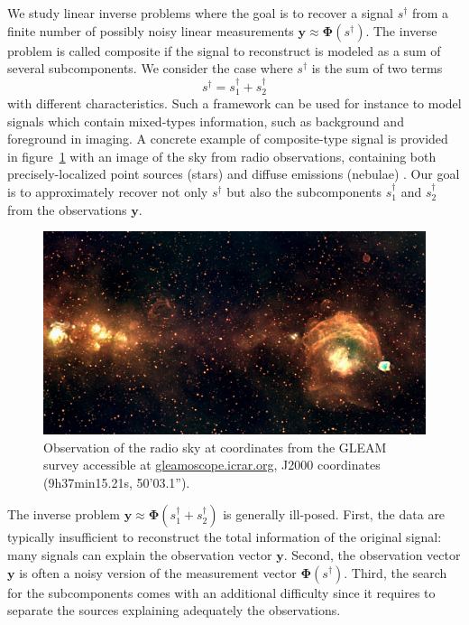 \documentclass[12pt]{article}
\begin{document}
    We study linear inverse problems where the goal is to recover a signal $s^\dagger$ from a finite number of possibly noisy linear measurements $\bm{y} \approx \bm{\Phi}(s^\dagger)$. 
    The inverse problem is called composite if the signal to reconstruct is modeled as a sum of several subcomponents. We consider the case where $s^\dagger$ is the sum of two terms
    \begin{equation}
        s^\dagger = s_1^\dagger + s_2^\dagger
        \label{eq:summodel}        
    \end{equation}
    with different characteristics.
    Such a framework can be used for instance to model signals which contain mixed-types information, such as background and foreground in imaging. A concrete example of composite-type signal is provided in figure~\ref{fig:gleam-sky} with an image of the sky from radio observations, containing both precisely-localized point sources (stars) and diffuse emissions (nebulae) \cite{hurley-walker2017}.
    Our goal is to approximately recover not only $s^\dagger$ but also the subcomponents $s_1^\dagger$ and $s_2^\dagger$ from the observations $\bm{y}$.

    \begin{figure}[t]
        \centering
        \includegraphics[width=0.8\linewidth]{figures/gleam9h37m15.21s-50deg25min03.1sec.png}
        \caption{Observation of the radio sky at coordinates from the GLEAM survey accessible at \href{https://gleamoscope.icrar.org/gleamoscope/trunk/src/}{gleamoscope.icrar.org}, J2000 coordinates (9h37min15.21s, 50'03.1'').}
        \label{fig:gleam-sky}
    \end{figure}
    
    
    The inverse problem $\bm{y} \approx \bm{\Phi}(s_1^\dagger + s_2^\dagger)$ is generally ill-posed. First, the data are typically insufficient to reconstruct the total information of the original signal: many signals can explain the observation vector $\bm{y}$. Second, the observation vector $\bm{y}$ is often a noisy version of the measurement vector $\bm{\Phi}(s^\dagger)$. Third, the search for the subcomponents comes with an additional difficulty since it requires to separate the sources explaining adequately the observations.
\end{document}
